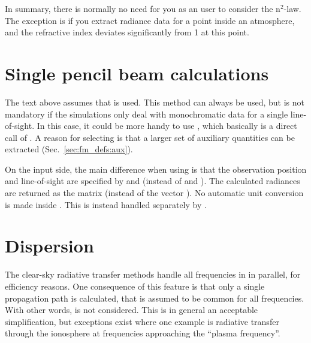 In summary, there is normally no need for you as an user to consider the
n$^2$-law. The exception is if you extract radiance data for a point inside an
atmosphere, and the refractive index deviates significantly from 1 at this
point.




\section{Single pencil beam calculations}
\label{sec:fm_defs:single_beams}

The text above assumes that  is used. This method can always be
used, but  is not mandatory if the simulations only deal with
monochromatic data for a single line-of-sight. In this case, it could be more
handy to use , which basically is a direct call of
. A reason for selecting  is that
a larger set of auxiliary quantities can be extracted
(Sec.~\ref{sec:fm_defs:aux}). 

On the input side, the main difference when using  is that
the observation position and line-of-sight are specified by 
and  (instead of  and
). The calculated radiances are returned as the matrix
 (instead of the vector ). 
No automatic unit conversion is made inside . This is
instead handled separately by .




\section{Dispersion}
\label{sec:fm_defs:dispersion}

The clear-sky radiative transfer methods handle all frequencies in
 in parallel, for efficiency reasons. One consequence of
this feature is that only a single propagation path is calculated, that is
assumed to be common for all frequencies. With other words,
 is not considered. This is in general an acceptable
simplification, but exceptions exist where one example is radiative
transfer through the ionosphere at frequencies approaching the ``plasma
frequency''.

